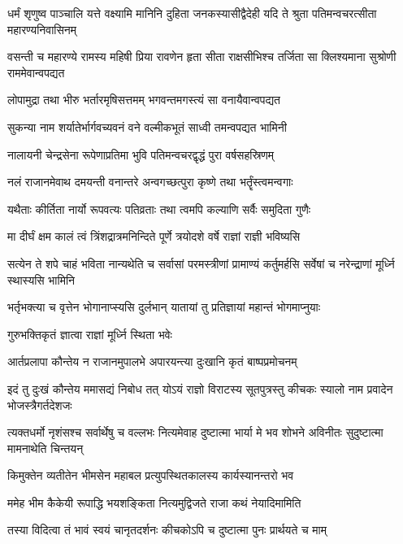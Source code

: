 \onelineshloka
{धर्मं शृणुष्व पाञ्चालि यत्ते वक्ष्यामि मानिनि}
\twolineshloka
{दुहिता जनकस्यासीद्वैदेही यदि ते श्रुता}
{पतिमन्वचरत्सीता महारण्यनिवासिनम्}


\threelineshloka
{वसन्ती च महारण्ये रामस्य महिषी प्रिया}
{रावणेन हृता सीता राक्षसीभिश्च तर्जिता}
{सा क्लिश्यमाना सुश्रोणी राममेवान्वपद्यत}


\twolineshloka
{लोपामुद्रा तथा भीरु भर्तारमृषिसत्तमम्}
{भगवन्तमगस्त्यं सा वनायैवान्वपद्यत}


\twolineshloka
{सुकन्या नाम शर्यातेर्भार्गवच्यवनं वने}
{वल्मीकभूतं साध्वी तमन्वपद्यत भामिनी}


\twolineshloka
{नालायनी चेन्द्रसेना रूपेणाप्रतिमा भुवि}
{पतिमन्वचरद्वृद्धं पुरा वर्षसहस्रिणम्}


\twolineshloka
{नलं राजानमेवाथ दमयन्ती वनान्तरे}
{अन्वगच्छत्पुरा कृष्णे तथा भर्तॄंस्त्वमन्वगाः}


\twolineshloka
{यथैताः कीर्तिता नार्यो रूपवत्यः पतिव्रताः}
{तथा त्वमपि कल्याणि सर्वैः समुदिता गुणैः}


\twolineshloka
{मा दीर्घं क्षम कालं त्वं त्रिंशद्रात्रमनिन्दिते}
{पूर्णे त्रयोदशे वर्षे राज्ञां राज्ञी भविष्यसि}


\onelineshloka
{सत्येन ते शपे चाहं भविता नान्यथेति च}
\twolineshloka
{सर्वासां परमस्त्रीणां प्रामाण्यं कर्तुमर्हसि}
{सर्वेषां च नरेन्द्राणां मूर्ध्नि स्थास्यसि भामिनि}


\twolineshloka
{भर्तृभक्त्या च वृत्तेन भोगानाप्स्यसि दुर्लभान्}
{यातायां तु प्रतिज्ञायां महान्तं भोगमाप्नुयाः}


\onelineshloka
{गुरुभक्तिकृतं ज्ञात्वा राज्ञां मूर्ध्नि स्थिता भवेः}



\twolineshloka
{आर्तप्रलापा कौन्तेय न राजानमुपालभे}
{अपारयन्त्या दुःखानि कृतं बाष्पप्रमोचनम्}


\onelineshloka
{इदं तु दुःखं कौन्तेय ममासद्यं निबोध तत्}
\twolineshloka
{योऽयं राज्ञो विराटस्य सूतपुत्रस्तु कीचकः}
{स्यालो नाम प्रवादेन भोजस्त्रैगर्तदेशजः}


\threelineshloka
{त्यक्तधर्मो नृशंसश्च सर्वार्थेषु च वल्लभः}
{नित्यमेवाह दुष्टात्मा भार्या मे भव शोभने}
{अविनीतः सुदुष्टात्मा मामनाथेति चिन्तयन्}


\twolineshloka
{किमुक्तेन व्यतीतेन भीमसेन महाबल}
{प्रत्युपस्थितकालस्य कार्यस्यानन्तरो भव}


\twolineshloka
{ममेह भीम कैकेयी रूपाद्धि भयशङ्किता}
{नित्यमुद्विजते राजा कथं नेयादिमामिति}


\twolineshloka
{तस्या विदित्वा तं भावं स्वयं चानृतदर्शनः}
{कीचकोऽपि च दुष्टात्मा पुनः प्रार्थयते च माम्}


